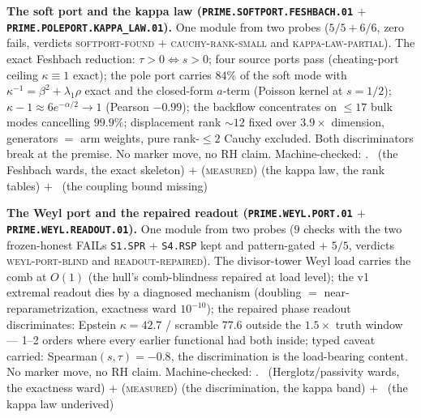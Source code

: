 \documentclass[11pt,a4paper]{article}
\theoremstyle{definition}
\begin{document}
\par\smallskip\noindent\textbf{The soft port and the kappa law
(\texttt{PRIME.SOFTPORT.\allowbreak FESHBACH.01} $+$
\texttt{PRIME.POLEPORT.\allowbreak KAPPA\_LAW.01}).}
One module from two probes ($5/5 + 6/6$, zero fails, verdicts
\textsc{softport-found} $+$ \textsc{cauchy-rank-small} and
\textsc{kappa-law-partial}).  The exact Feshbach reduction:
$\tau > 0 \Leftrightarrow s > 0$; four source ports pass
(cheating-port ceiling $\kappa \equiv 1$ exact); the pole port
carries $84\%$ of the soft mode with $\kappa^{-1} = \beta^2 +
\lambda_1\rho$ exact and the closed-form $a$-term (Poisson
kernel at $s = 1/2$); $\kappa - 1 \approx 6e^{-\alpha/2} \to 1$
(Pearson $-0.99$); the backflow concentrates on $\le 17$ bulk
modes cancelling $99.9\%$; displacement rank ${\sim}12$ fixed
over $3.9\times$ dimension, generators $=$ arm weights, pure
rank-$\le2$ Cauchy excluded.  Both discriminators break at the
premise.  No marker move, no RH claim.
Machine-checked: .
\mE\ (the Feshbach wards, the exact skeleton) $+$
(\textsc{measured}) (the kappa law, the rank tables) $+$ \mO\
(the coupling bound missing)
\par\smallskip

\par\smallskip\noindent\textbf{The Weyl port and the repaired
readout (\texttt{PRIME.WEYL.\allowbreak PORT.01} $+$
\texttt{PRIME.WEYL.\allowbreak READOUT.01}).}
One module from two probes ($9$ checks with the two
frozen-honest FAILs \texttt{S1.SPR} $+$ \texttt{S4.RSP} kept
and pattern-gated $+$ $5/5$, verdicts \textsc{weyl-port-blind}
and \textsc{readout-repaired}).  The divisor-tower Weyl load
carries the comb at $O(1)$ (the hull's comb-blindness repaired
at load level); the v1 extremal readout dies by a diagnosed
mechanism (doubling $=$ near-reparametrization, exactness ward
$10^{-10}$); the repaired phase readout discriminates: Epstein
$\kappa = 42.7$ / scramble $77.6$ outside the $1.5\times$ truth
window --- 1--2 orders where every earlier functional had both
inside; typed caveat carried: Spearman$(s,\tau) = -0.8$, the
discrimination is the load-bearing content.  No marker move, no
RH claim.
Machine-checked: .
\mE\ (Herglotz/passivity wards, the exactness ward) $+$
(\textsc{measured}) (the discrimination, the kappa band) $+$
\mO\ (the kappa law underived)
\par\smallskip
\end{document}
